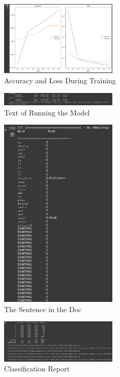 \documentclass{solutionclass} %
\begin{document}
\begin{figure}[h!]
    \caption{Accuracy and Loss During Training}
    \centering
    \includegraphics[width=0.5\textwidth]{img/1/6.png}
\end{figure}

\begin{figure}[h!]
    \caption{Text of Running the Model}
    \centering
    \includegraphics[width=0.5\textwidth]{img/1/7.png}
\end{figure}

\begin{figure}[h!]
    \caption{The Sentence in the Doc}
    \centering
    \includegraphics[width=0.5\textwidth]{img/1/8.png}
\end{figure}


\begin{figure}[h!]
    \caption{Classification Report}
    \centering
    \includegraphics[width=0.5\textwidth]{img/1/10.png}
\end{figure}
\end{document}
